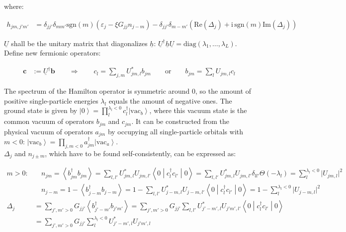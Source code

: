 \documentclass[8pt, a4paper]{article}
\newcommand{\sgn}{\mathrm{sgn}}
\newcommand{\ket}[1]{\left\vert#1\right\rangle}
\newcommand{\bracket}[3]{\left\langle#1\middle\vert#2\middle\vert#3\right\rangle}
\newcommand{\expec}[1]{\left\langle#1\right\rangle}
\begin{document}
where:

\begin{align*}
h_{jm,j'm'} &= \delta_{jj'}\delta_{mm'}\sgn(m)\left(\varepsilon_j -\xi G_{jj}n_{j-m}\right)- \delta_{jj'}\delta_{m-m'}(\mathrm{Re}(\Delta_j) + \mathrm i\,\sgn(m)\mathrm{Im}(\Delta_j))
\end{align*}

$\underline U$ shall be the unitary matrix that diagonalizes $\underline h$: $\underline U^\dagger \underline h \underline U = \mathrm{diag}(\lambda_1,\ldots,\lambda_L)$.\\
Define new fermionic operators:

\begin{align*}
\boldsymbol c &:= \underline U^\dagger \boldsymbol b\qquad\Rightarrow\qquad c_{l} = \sum_{j,m} U_{jm,l}^*b_{jm}\qquad\text{or}\qquad b_{jm} = \sum_lU_{jm,l}c_l
\end{align*}

The spectrum of the Hamilton operator is symmetric around 0, so the amount of positive single-particle energies $\lambda_l$ equals the amount of negative ones. The ground state is given by $\ket 0 = \prod_l^{\lambda_l<0}c_l^\dagger \ket{\mathrm{vac}_b}$, where this vacuum state is the common vacuum of operators $b_{jm}$ and $c_{jm}$. It can be constructed from the physical vacuum of operators $a_{jm}$ by occupying all single-particle orbitals with $m<0$: $\ket{\mathrm{vac}_b} = \prod_{j,m<0}a_{jm}^\dagger \ket{\mathrm{vac}_a}$.\\

$\Delta_j$ and $n_{j\pm m}$, which have to be found self-consistently, can be expressed as:

\begin{align*}
m>0:&\quad n_{jm} = \expec{b_{jm}^\dagger b_{jm}} = \sum_{l,l'}U_{jm,l}^*U_{jm,l'}\bracket0{c_l^\dagger c_{l'}}0 = \sum_{l,l'}U_{jm,l}^*U_{jm,l'}\delta_{ll'}\Theta(-\lambda_l)= \sum_l^{\lambda_l < 0}\vert U_{jm,l}\vert^2
\\
&\quad n_{j-m} = 1-\expec{b_{j-m}^\dagger b_{j-m}} = 1-\sum_{l,l'}U_{j-m,l}^*U_{j-m,l'}\bracket0{c_l^\dagger c_{l'}}0 = 1-\sum_l^{\lambda_l < 0}\vert U_{j-m,l}\vert^2
\\
\Delta_j &= \sum_{j',m'>0} G_{jj'}\expec{b_{j'-m'}^\dagger b_{j'm'}} = \sum_{j',m'>0}G_{jj'}\sum_{l,l'}U_{j'-m',l}^* U_{j'm',l'}\bracket 0{c_l^\dagger c_{l'}}0
\\&=
\sum_{j',m'>0}G_{jj'}\sum_l^{\lambda_l<0}U_{j'-m',l}^* U_{j'm',l}
\end{align*}
\end{document}
